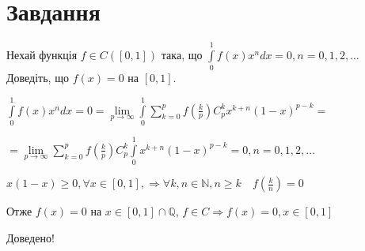 
\chapter{Завдання \theHchapter}

\begin{tcolorbox}[title=Завдання]
    Нехай функція $f \in C([0,1])$ така, що 
    $\int\limits_0^1 f(x) x^n d x=0, n=0,1,2, \ldots$ 
    Доведіть, що $f(x)=0$ на $[0,1]$.
\end{tcolorbox}



$\int\limits_0^1 f(x) x^n d x=0 = \lim\limits_{p\rightarrow \infty}
\int\limits_0^1 \sum\limits_{k = 0}^p 
f(\frac{k}{p})C_p^kx^{k+n}(1 - x)^{p - k}=$


$=
\lim\limits_{p\rightarrow \infty}
\sum\limits_{k = 0}^p f(\frac{k}{p})C_p^k
\int\limits_0^1 x^{k+n}(1 - x)^{p - k}=
0, n = 0, 1, 2,\dots 
$ 


$
x(1 - x) \geq 0, \forall x \in [0, 1], \Rightarrow
\forall k, n \in \mathbb{N}, n \geq k \quad f(\frac{k}{n}) = 0
$


Отже $f(x) = 0$ на $x \in [0, 1]\cap \mathbb{Q}$,
\quad $f \in C  \Rightarrow f(x) = 0, x \in [0, 1]$  


Доведено!
